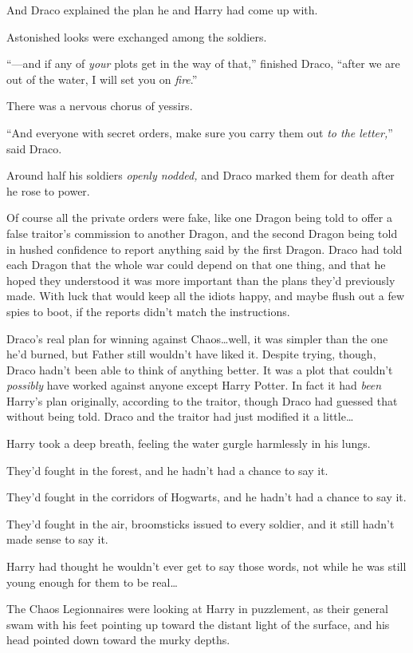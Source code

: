 And Draco explained the plan he and Harry had come up with.

Astonished looks were exchanged among the soldiers.

“—and if any of \emph{your} plots get in the way of that,” finished Draco, “after we are out of the water, I will set you on \emph{fire}.”

There was a nervous chorus of yessirs.

“And everyone with secret orders, make sure you carry them out \emph{to the letter,}” said Draco.

Around half his soldiers \emph{openly nodded,} and Draco marked them for death after he rose to power.

Of course all the private orders were fake, like one Dragon being told to offer a false traitor’s commission to another Dragon, and the second Dragon being told in hushed confidence to report anything said by the first Dragon. Draco had told each Dragon that the whole war could depend on that one thing, and that he hoped they understood it was more important than the plans they’d previously made. With luck that would keep all the idiots happy, and maybe flush out a few spies to boot, if the reports didn’t match the instructions.

Draco’s real plan for winning against Chaos…well, it was simpler than the one he’d burned, but Father still wouldn’t have liked it. Despite trying, though, Draco hadn’t been able to think of anything better. It was a plot that couldn’t \emph{possibly} have worked against anyone except Harry Potter. In fact it had \emph{been} Harry’s plan originally, according to the traitor, though Draco had guessed that without being told. Draco and the traitor had just modified it a little…

\later

Harry took a deep breath, feeling the water gurgle harmlessly in his lungs.

They’d fought in the forest, and he hadn’t had a chance to say it.

They’d fought in the corridors of Hogwarts, and he hadn’t had a chance to say it.

They’d fought in the air, broomsticks issued to every soldier, and it still hadn’t made sense to say it.

Harry had thought he wouldn’t ever get to say those words, not while he was still young enough for them to be real…

The Chaos Legionnaires were looking at Harry in puzzlement, as their general swam with his feet pointing up toward the distant light of the surface, and his head pointed down toward the murky depths.

